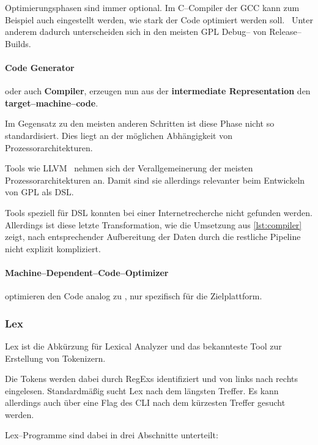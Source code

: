 Optimierungsphasen sind immer optional.
Im C--Compiler der \ac{GCC} kann zum Beispiel auch eingestellt werden, wie stark der Code optimiert werden soll.~\autocite{gnu-project-no-date}
Unter anderem dadurch unterscheiden sich in den meisten \ac{GPL} Debug-- von Release--Builds.

\paragraph{Code Generator} oder auch \textbf{Compiler}, erzeugen nun aus der \textbf{intermediate Representation} den \textbf{target--machine--code}.

Im Gegensatz zu den meisten anderen Schritten ist diese Phase nicht so standardisiert.
Dies liegt an der möglichen Abhängigkeit von Prozessorarchitekturen.

Tools wie \ac{LLVM}~\autocite{llvm-project-2024} nehmen sich der Verallgemeinerung der meisten Prozessorarchitekturen an.
Damit sind sie allerdings relevanter beim Entwickeln von \ac{GPL} als \ac{DSL}.

Tools speziell für \ac{DSL} konnten bei einer Internetrecherche nicht gefunden werden.
Allerdings ist diese letzte Transformation, wie die Umsetzung aus \autoref{lst:compiler} zeigt, nach entsprechender Aufbereitung der Daten durch die restliche Pipeline nicht explizit kompliziert.

\paragraph{Machine--Dependent--Code--Optimizer} optimieren den Code analog zu , nur spezifisch für die Zielplattform.

\subsubsection{Lex}\label{subsubsec:lex}
Lex ist die Abkürzung für Lexical Analyzer und das bekannteste Tool zur Erstellung von Tokenizern.

Die Tokens werden dabei durch \acp{RegEx} identifiziert und von links nach rechts eingelesen.
Standardmäßig sucht Lex nach dem längsten Treffer.
Es kann allerdings auch über eine Flag des \ac{CLI} nach dem kürzesten Treffer gesucht werden.

Lex--Programme sind dabei in drei Abschnitte unterteilt:~\autocite{debray-no-date}


